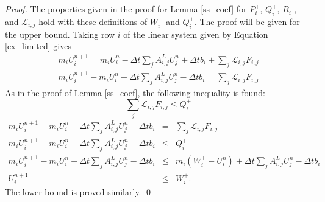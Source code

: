 \begin{proof}
   The properties given in the proof for Lemma \ref{ss_coef} for $P_i^\pm$,
   $Q_i^\pm$, $R_i^\pm$, and $\mathcal{L}_{i,j}$ hold with these definitions
   of $W_i^\pm$ and $Q_i^\pm$.
   The proof will be given for the upper bound. 
   Taking row $i$ of the linear system given by Equation \ref{ex_limited} gives
   \begin{gather*}
      m_i U_i^{n+1} = m_i U_i^n - \Delta t\sum\limits_j A_{i,j}^L U_j^n + \Delta t b_i
         + \sum\limits_j \mathcal{L}_{i,j}F_{i,j}\\
      m_i U_i^{n+1} - m_i U_i^n + \Delta t\sum\limits_j A_{i,j}^L U_j^n - \Delta t b_i
         = \sum\limits_j \mathcal{L}_{i,j}F_{i,j}
   \end{gather*}
   As in the proof of Lemma \ref{ss_coef}, the following inequality is found:
   \[
      \sum\limits_j \mathcal{L}_{i,j}F_{i,j} \leq Q_i^+
   \]
   \begin{eqnarray*}
      m_i U_i^{n+1} - m_i U_i^n + \Delta t\sum\limits_j A_{i,j}^L U_j^n - \Delta t b_i
      & = & \sum\limits_j \mathcal{L}_{i,j}F_{i,j}\\
      m_i U_i^{n+1} - m_i U_i^n + \Delta t\sum\limits_j A_{i,j}^L U_j^n - \Delta t b_i
      & \leq & Q_i^+\\
      m_i U_i^{n+1} - m_i U_i^n + \Delta t\sum\limits_j A_{i,j}^L U_j^n - \Delta t b_i
      & \leq & m_i(W_i^+-U_i^n) + \Delta t\sum\limits_j A_{i,j}^L U_j^n
         - \Delta t b_i\\
      U_i^{n+1} & \leq & W_i^+.
   \end{eqnarray*}
   The lower bound is proved similarly.
   \qed
\end{proof}